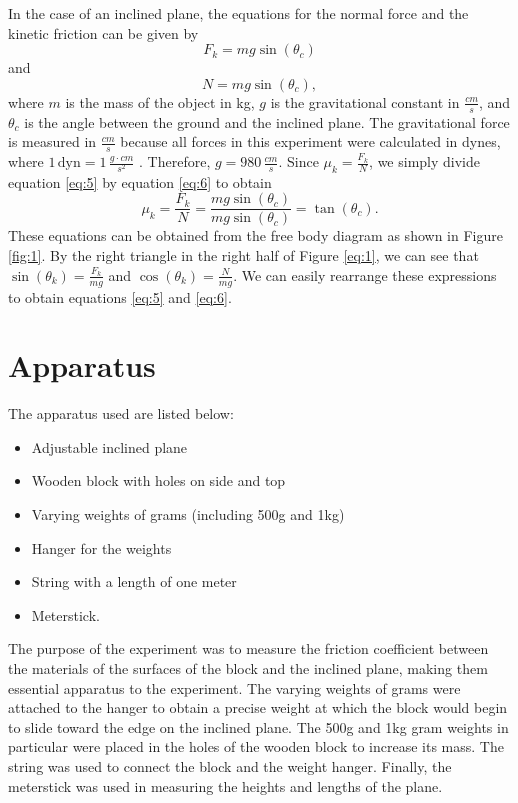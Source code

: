 \documentclass{article}
\theoremstyle{definition}
\begin{document}
In the case of an inclined plane, the equations for the normal force and the kinetic friction can 
be given by
\begin{equation} \label{eq:5}
    F_k = mg \sin (\theta_c)
\end{equation}
and
\begin{equation} \label{eq:6}
    N = mg \sin (\theta_c),
\end{equation}
where $m$ is the mass of the object in kg, $g$ is the gravitational constant in
$\frac{cm}{s}$, and $\theta_c$ is the angle between the ground and the inclined 
plane. The gravitational force is measured in $\frac{cm}{s}$ because all forces
in this experiment were calculated in dynes, where $1 \, \text{dyn} = 1 \, \frac{g\cdot cm}{s^2}$
. Therefore, $g = 980 \, \frac{cm}{s}$. Since $\mu_k = \frac{F_k}{N}$, we simply
divide equation \ref{eq:5} by equation \ref{eq:6} to obtain
\begin{equation}\label{eq:7}
    \mu_k = \frac{F_k}{N} = \frac{mg \sin (\theta_c)}{mg \sin (\theta_c)} =
    \tan (\theta_c).
\end{equation}
These equations can be obtained from the free body diagram as shown in Figure
 \ref{fig:1}. By the right triangle in the right half of  Figure \ref{eq:1}, 
 we can see that $\sin(\theta_k) = \frac{F_k}{mg}$ and
$\cos(\theta_k) = \frac{N}{mg}$. We can easily rearrange these expressions to obtain equations
\ref{eq:5} and \ref{eq:6}.
\newpage
\section{Apparatus}
The apparatus used are listed below: 
\begin{itemize}
    \item Adjustable inclined plane
    \item Wooden block with holes on side and top
    \item Varying weights of grams (including 500g and 1kg)
    \item Hanger for the weights
    \item String with a length of one meter
    \item Meterstick.
\end{itemize}
The purpose of the experiment was to measure the friction coefficient between the materials
of the surfaces of the block and the inclined plane, making them essential apparatus to the
experiment. The varying weights of grams were attached to the hanger to obtain a precise 
weight at which the block would begin to slide toward the edge on the inclined plane. The 500g
and 1kg gram weights in particular were placed in the holes of the wooden block to increase
its mass. The string was used to connect the block and the weight hanger. Finally, the meterstick was used
in measuring the heights and lengths of the plane.
\end{document}
